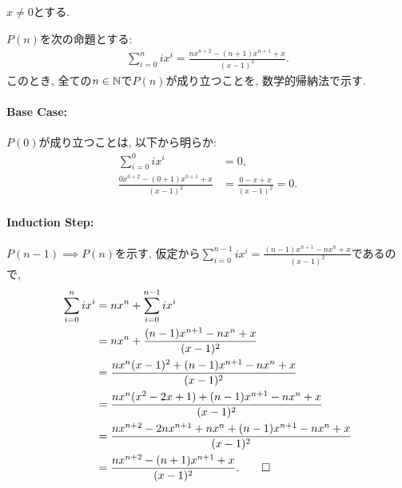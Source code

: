 \begin{proof*}
  $x\neq 0$とする.
  
  $P(n)$を次の命題とする:
  \begin{align*}
    \sum_{i=0}^n ix^i=\frac{nx^{n+2}-(n+1)x^{n+1}+x}{(x-1)^2}.
  \end{align*}
  このとき,
  全ての$n\in\mathbb{N}$で$P(n)$が成り立つことを,
  数学的帰納法で示す.

  \paragraph{Base Case:}
  $P(0)$が成り立つことは, 以下から明らか:
  \begin{align*}
    \sum_{i=0}^0 ix^i&=0,\\
    \frac{0x^{0+2}-(0+1)x^{0+1}+x}{(x-1)^2}&=\frac{0-x+x}{(x-1)^2}=0.
  \end{align*}

  \paragraph{Induction Step:}
  $P(n-1)\implies P(n)$を示す.
  仮定から$\sum_{i=0}^{n-1} ix^i=\frac{(n-1)x^{n+1}-nx^{n}+x}{(x-1)^2}$であるので,
  \begin{align*}
    \sum_{i=0}^n ix^i
    &=nx^n+\sum_{i=0}^{n-1} ix^i\\
    &=nx^n+\frac{(n-1)x^{n+1}-nx^{n}+x}{(x-1)^2}\\
    &=\frac{nx^n(x-1)^2+(n-1)x^{n+1}-nx^{n}+x}{(x-1)^2}\\
    &=\frac{nx^n(x^2-2x+1)+(n-1)x^{n+1}-nx^{n}+x}{(x-1)^2}\\
    &=\frac{nx^{n+2}-2nx^{n+1}+nx^n+(n-1)x^{n+1}-nx^{n}+x}{(x-1)^2}\\
    &=\frac{nx^{n+2}-(n+1)x^{n+1}+x}{(x-1)^2}
    .\qedhere
  \end{align*}
\end{proof*}
